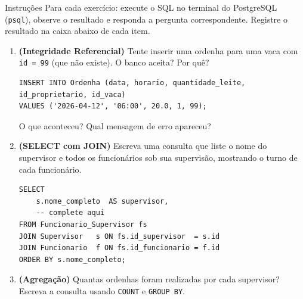 \documentclass[12pt]{article}
\begin{document}
\begin{block}{Instruções}
Para cada exercício: execute o SQL no terminal do PostgreSQL (\texttt{psql}),
observe o resultado e responda a pergunta correspondente. Registre o resultado
na caixa abaixo de cada item.
\end{block}

\vspace{0.4cm}

\begin{enumerate}[label=\textbf{Ex.\,\arabic*:}, leftmargin=*]

  \item \textbf{(Integridade Referencial)} Tente inserir uma ordenha para uma
  vaca com \texttt{id = 99} (que não existe). O banco aceita? Por quê?

  \begin{lstlisting}[caption={Teste de integridade}]
INSERT INTO Ordenha (data, horario, quantidade_leite, id_proprietario, id_vaca)
VALUES ('2026-04-12', '06:00', 20.0, 1, 99);
  \end{lstlisting}

  O que aconteceu? Qual mensagem de erro apareceu? 
  \begin{resposta}
  \end{resposta}

  \vspace{0.4cm}

  \item \textbf{(SELECT com JOIN)} Escreva uma consulta que liste o nome do
  supervisor e todos os funcionários sob sua supervisão, mostrando o turno
  de cada funcionário.

  \begin{lstlisting}[caption={Modelo inicial --- complete o SELECT}]
SELECT
    s.nome_completo  AS supervisor,
    -- complete aqui
FROM Funcionario_Supervisor fs
JOIN Supervisor   s ON fs.id_supervisor  = s.id
JOIN Funcionario  f ON fs.id_funcionario = f.id
ORDER BY s.nome_completo;
  \end{lstlisting}

  \begin{resposta}
  \end{resposta}

  \vspace{0.4cm}

  \item \textbf{(Agregação)} Quantas ordenhas foram realizadas por cada
  supervisor? Escreva a consulta usando \texttt{COUNT} e \texttt{GROUP BY}.


\end{enumerate}
\end{document}
